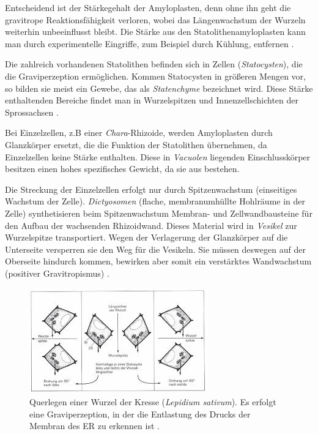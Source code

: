 \documentclass[
11pt, 
ngerman,
listof=totocnumbered,
oneside,
bibliography=totocnumbered,
abstracton
]{scrreprt}
\begin{document}
Entscheidend ist der Stärkegehalt der Amyloplasten, denn ohne ihn geht die gravitrope Reaktionsfähigkeit verloren, wobei das Längenwachstum der Wurzeln weiterhin unbeeinflusst bleibt.
Die Stärke aus den Statolithenamyloplasten kann man durch experimentelle Eingriffe, zum Beispiel durch Kühlung, entfernen \parencite[452]{Strasburger}.

Die zahlreich vorhandenen Statolithen befinden sich in Zellen (\emph{Statocysten}), die die Graviperzeption ermöglichen. Kommen Statocysten in größeren Mengen vor, so bilden sie meist ein Gewebe, das als \emph{Statenchyme} bezeichnet wird. Diese Stärke enthaltenden Bereiche findet man in Wurzelspitzen und Innenzellschichten der Sprossachsen \parencite[501--502]{Nultsch}.  


Bei Einzelzellen, z.B einer \emph{Chara}-Rhizoide, werden Amyloplasten durch {\glqq Glanzkörper\grqq} ersetzt, die die Funktion der Statolithen übernehmen, da Einzelzellen keine Stärke enthalten. Diese in \emph{Vacuolen} liegenden Einschlusskörper besitzen einen hohes spezifisches Gewicht, da sie aus  bestehen.

Die Streckung der Einzelzellen erfolgt nur durch Spitzenwachstum (einseitiges Wachstum der Zelle).
\emph{Dictyosomen} (flache, membranumhüllte Hohlräume in der Zelle) synthetisieren beim Spitzenwachstum Membran- und Zellwandbausteine für den Aufbau der wachsenden Rhizoidwand. Dieses Material wird in \emph{Vesikel} zur Wurzelspitze transportiert.
Wegen der Verlagerung der {\glqq Glanzkörper\grqq} auf die Unterseite
versperren sie den Weg für die Vesikeln. Sie müssen deswegen auf der Oberseite hindurch kommen, bewirken aber somit ein verstärktes Wandwachstum (positiver Gravitropismus) \parencite[453--454]{Strasburger}.
  
 \begin{figure}[H]
 	\centering 
 	\includegraphics[width = 0.75\linewidth]{images/Graviperzeption.jpeg}
 	\caption{Querlegen einer Wurzel der Kresse (\emph{Lepidium sativum}). Es erfolgt eine Graviperzeption, in der die Entlastung des Drucks der Membran des ER zu erkennen ist \parencite[533]{Luettge}. \label{Graviperzeption}}
 \end{figure} 
 
\end{document}
